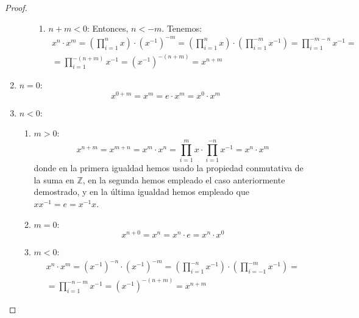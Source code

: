 \begin{prop}
\begin{proof}
\begin{enumerate}
\begin{enumerate}
\begin{enumerate}
                \item \ul{$n+m<0$}:
                Entonces, $n<-m$. Tenemos:
                \begin{multline*}
                    x^n \cdot x^m =\left(\prod_{i=1}^n x\right)\cdot \left(x^{-1}\right)^{-m}
                    =\left(\prod_{i=1}^n x \right)\cdot\left(\prod_{i=1}^{-m} x^{-1}\right) =\prod_{i=1}^{-m-n} x^{-1}
                    =\\=\prod_{i=1}^{-(n+m)} x^{-1} = (x^{-1})^{-(n+m)} = x^{n+m}
                \end{multline*}
            \end{enumerate}

        \end{enumerate}

        \item \ul{$n=0$}:
        \begin{equation*}
            x^{0+m} = x^m = e \cdot x^m = x^0 \cdot x^m
        \end{equation*}

        \item \ul{$n<0$}:
        \begin{enumerate}
            \item \ul{$m>0$}:
            \begin{equation*}
                x^{n+m} = x^{m+n} = x^{m} \cdot x^{n}
                = \prod_{i=1}^{m} x \cdot \prod_{i=1}^{-n} x^{-1}
                = x^n \cdot x^m
            \end{equation*}
            donde en la primera igualdad hemos usado la propiedad conmutativa de la suma en $\mathbb{Z}$, en la segunda hemos empleado el caso anteriormente demostrado, y en la última igualdad hemos empleado que $xx^{-1} = e = x^{-1}x$.

            \item \ul{$m=0$}:
            \begin{equation*}
                x^{n+0} = x^n = x^n \cdot e = x^n \cdot x^0
            \end{equation*}

            \item \ul{$m<0$}:
            \begin{multline*}
                x^n \cdot x^m =\left(x^{-1}\right)^{-n} \cdot\left(x^{-1}\right)^{-m}
                = \left(\prod_{i=1}^{-n} x^{-1}\right) \cdot\left(\prod_{i=-1}^{-m} x^{-1}\right) =\\
                = \prod_{i=1}^{-n-m} x^{-1} = \left(x^{-1}\right)^{-(n+m)} = x^{n+m}
            \end{multline*}
        \end{enumerate}
    \end{enumerate}
    \end{proof}
\end{prop}

